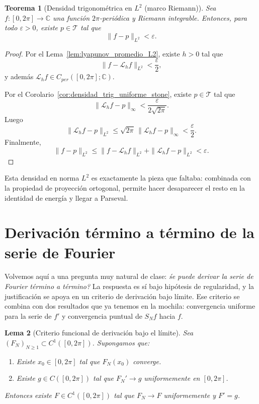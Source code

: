 \documentclass[a4paper,11pt]{report}
\newtheorem{theorem}{Teorema}[chapter]
\newtheorem{lemma}[theorem]{Lema}
\begin{document}
\begin{theorem}[Densidad trigonom\'etrica en $L^2$ (marco Riemann)]\label{thm:densidad_trig_L2_riemann}
Sea $f:[0,2\pi]\to\mathbb C$ una función $2\pi$-periódica y Riemann integrable. Entonces, para todo $\varepsilon>0$, existe $p\in\mathcal T$ tal que
\[
\|f-p\|_{L^2}<\varepsilon.
\]
\end{theorem}

\begin{proof}
Por el Lema~\ref{lem:lyapunov_promedio_L2}, existe $h>0$ tal que
\[
\|f-\mathcal L_h f\|_{L^2}<\frac{\varepsilon}{2},
\]
y además $\mathcal L_h f\in C_{per}([0,2\pi];\mathbb C)$.

Por el Corolario~\ref{cor:densidad_trig_uniforme_stone}, existe $p\in\mathcal T$ tal que
\[
\|\mathcal L_h f-p\|_\infty<\frac{\varepsilon}{2\sqrt{2\pi}}.
\]
Luego
\[
\|\mathcal L_h f-p\|_{L^2}\le \sqrt{2\pi}\,\|\mathcal L_h f-p\|_\infty<\frac{\varepsilon}{2}.
\]
Finalmente,
\[
\|f-p\|_{L^2}\le \|f-\mathcal L_h f\|_{L^2}+\|\mathcal L_h f-p\|_{L^2}<\varepsilon.
\]
\end{proof}

Esta densidad en norma $L^2$ es exactamente la pieza que faltaba: combinada con la propiedad de proyecci\'on ortogonal, permite hacer desaparecer el resto en la identidad de energ\'ia y llegar a Parseval.

\section{Derivación término a término de la serie de Fourier}

Volvemos aqu\'i a una pregunta muy natural de clase: \textit{\'se puede derivar la serie de Fourier t\'ermino a t\'ermino?} La respuesta es s\'i bajo hip\'otesis de regularidad, y la justificaci\'on se apoya en un criterio de derivaci\'on bajo l\'imite. Ese criterio se combina con dos resultados que ya tenemos en la mochila: convergencia uniforme para la serie de $f'$ y convergencia puntual de $S_N f$ hacia $f$.

\begin{lemma}[Criterio funcional de derivación bajo el límite]\label{lem:criterio_funcional_derivacion}
Sea $(F_N)_{N\ge 1}\subset C^1([0,2\pi])$. Supongamos que:
\begin{enumerate}
\item Existe $x_0\in[0,2\pi]$ tal que $F_N(x_0)$ converge.
\item Existe $g\in C([0,2\pi])$ tal que $F_N'\to g$ uniformemente en $[0,2\pi]$.
\end{enumerate}
Entonces existe $F\in C^1([0,2\pi])$ tal que $F_N\to F$ uniformemente y $F'=g$.
\end{lemma}
\end{document}
